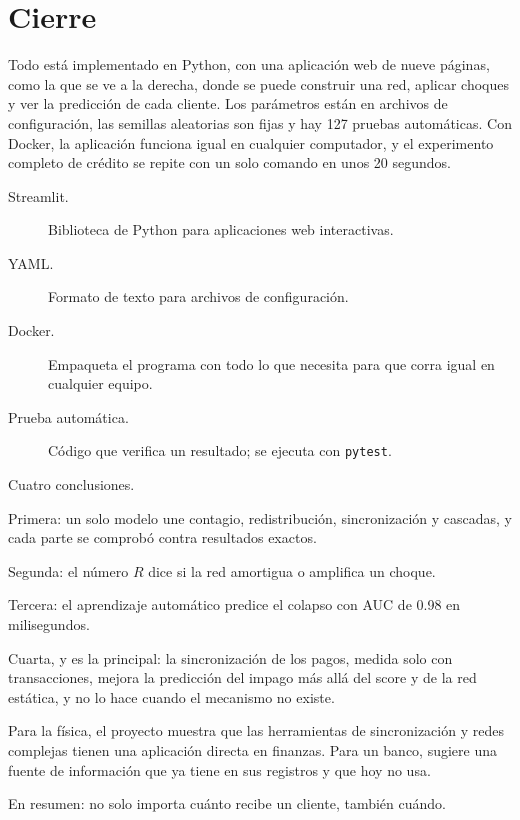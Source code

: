 \section{Cierre}

\begin{decir}
Todo está implementado en Python, con una aplicación web de nueve páginas, como la
que se ve a la derecha, donde se puede construir una red, aplicar choques y ver la
predicción de cada cliente. Los
parámetros están en archivos de configuración, las semillas aleatorias son fijas y hay
127 pruebas automáticas. Con Docker, la aplicación funciona igual en cualquier
computador, y el experimento completo de crédito se repite con un solo comando en unos
20 segundos.
\end{decir}
\begin{terminos}
\begin{description}
\item[Streamlit.] Biblioteca de Python para aplicaciones web interactivas.
\item[YAML.] Formato de texto para archivos de configuración.
\item[Docker.] Empaqueta el programa con todo lo que necesita para que corra igual en
cualquier equipo.
\item[Prueba automática.] Código que verifica un resultado; se ejecuta con
\texttt{pytest}.
\end{description}
\end{terminos}

\begin{decir}
Cuatro conclusiones.

Primera: un solo modelo une contagio, redistribución, sincronización y cascadas, y cada
parte se comprobó contra resultados exactos.

Segunda: el número $R$ dice si la red amortigua o amplifica un choque.

Tercera: el aprendizaje automático predice el colapso con AUC de 0.98 en milisegundos.

Cuarta, y es la principal: la sincronización de los pagos, medida solo con
transacciones, mejora la predicción del impago más allá del score y de la red estática,
y no lo hace cuando el mecanismo no existe.

Para la física, el proyecto muestra que las herramientas de sincronización y redes
complejas tienen una aplicación directa en finanzas. Para un banco, sugiere una fuente
de información que ya tiene en sus registros y que hoy no usa.

En resumen: no solo importa cuánto recibe un cliente, también cuándo.
\end{decir}

